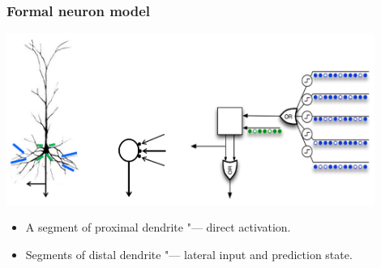 \documentclass[default]{beamer}
\begin{document}
	\begin{frame}
		\frametitle{Formal neuron model}
		
		\begin{center}
			\includegraphics[width=0.9\textwidth]{phisio/neuro_htm}
		\end{center}
		
		\begin{itemize}
			\item A segment of proximal dendrite "--- direct activation.
			\item Segments of distal dendrite "--- lateral input and prediction state.
		\end{itemize}
	\end{frame}
	
\end{document}
